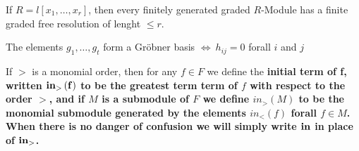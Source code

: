 \documentclass{article}
\begin{document}






\begin{thm}
	If \( R = l \left[ x_{1}, \dots ,x_{r} \right] \), 
then every finitely generated graded \( R\)-Module has a finite graded free resolution of lenght \( \le r  \).
\end{thm}



\begin{thm}
	The elements \( g_1,\dots,g_t \) form a Gr\"obner basis \( \iff \ h_{ij}=0 \) forall \( i\) and \(j\)
\end{thm}


\begin{defn}
	If \( > \) is a monomial order, 
	then for any \( f \in F \) we define the \bf{initial term of f}, 
	written \( \bf{in}_{>}\left( f \right) \) 
	to be the greatest term term of \( f \) 
	with respect to the order \( > \), 
	and if \( M \) is a submodule of \( F\) 
	we define \( in_{>}\left( M \right) \) 
	to be the monomial submodule generated by 
	the elements \( in_{<} \left( f \right) \) 
	forall \( f \in M \). 
	When there is no danger of confusion 
	we will simply write \( \bf{in} \) in place of \( \bf{in}_{>} \).
\end{defn}


\end{document}
